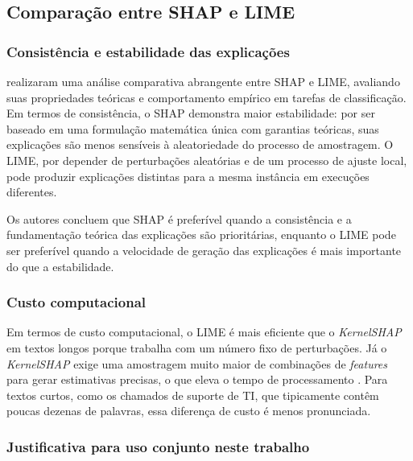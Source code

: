 \documentclass[
    12pt,                %
    openright,           %
    oneside,             %
    a4paper,             %
    english,             %
    brazil               %
]{abntex2}
\begin{document}
\subsection{Comparação entre SHAP e LIME}
\label{subsec:shap_lime}

\subsubsection{Consistência e estabilidade das explicações}
\label{subsubsec:comparacao_consistencia}

 realizaram uma análise comparativa abrangente entre SHAP e LIME, avaliando suas propriedades teóricas e comportamento empírico em tarefas de classificação. Em termos de consistência, o SHAP demonstra maior estabilidade: por ser baseado em uma formulação matemática única com garantias teóricas, suas explicações são menos sensíveis à aleatoriedade do processo de amostragem. O LIME, por depender de perturbações aleatórias e de um processo de ajuste local, pode produzir explicações distintas para a mesma instância em execuções diferentes.

Os autores concluem que SHAP é preferível quando a consistência e a fundamentação teórica das explicações são prioritárias, enquanto o LIME pode ser preferível quando a velocidade de geração das explicações é mais importante do que a estabilidade.

\subsubsection{Custo computacional}
\label{subsubsec:comparacao_custo}

Em termos de custo computacional, o LIME é mais eficiente que o 
\textit{KernelSHAP} em textos longos porque trabalha com um número 
fixo de perturbações. Já o \textit{KernelSHAP} exige uma amostragem 
muito maior de combinações de \textit{features} para gerar estimativas 
precisas, o que eleva o tempo de processamento \cite{salih2023}. 
Para textos curtos, como os chamados de suporte de TI, que tipicamente 
contêm poucas dezenas de palavras, essa diferença de custo é menos 
pronunciada.
\subsubsection{Justificativa para uso conjunto neste trabalho}
\label{subsubsec:comparacao_justificativa}
\end{document}
